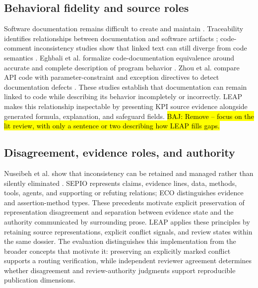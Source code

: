 \documentclass[a4paper,fleqn]{cas-dc}
\newcommand{\baj}[1]{{\sethlcolor{yellow}\hl{BAJ: #1}}}
\begin{document}
\subsection{Behavioral fidelity and source roles}
Software documentation remains difficult to create and maintain \citep{Aghajani2019}. Traceability identifies relationships between documentation and software artifacts \citep{MaderGotel2012}; code-comment inconsistency studies show that linked text can still diverge from code semantics \citep{Wen2019,Xu2024}. Eghbali et al. formalize code-documentation equivalence around accurate and complete description of program behavior \citep{Eghbali2026}. Zhou et al. compare API code with parameter-constraint and exception directives to detect documentation defects \citep{Zhou2017}. These studies establish that documentation can remain linked to code while describing its behavior incompletely or incorrectly. LEAP makes this relationship inspectable by presenting KPI source evidence alongside generated formula, explanation, and safeguard fields.
\baj{Remove -- focus on the lit review, with only a sentence or two describing how LEAP fills gaps.}
%

\subsection{Disagreement, evidence roles, and authority}
Nuseibeh et al. show that inconsistency can be retained and managed rather than silently eliminated \citep{Nuseibeh2001}. SEPIO \citep{Brush2016} represents claims, evidence lines, data, methods, tools, agents, and supporting or refuting relations; ECO \citep{Giglio2019} distinguishes evidence and assertion-method types. These precedents motivate explicit preservation of representation disagreement and separation between evidence state and the authority communicated by surrounding prose. LEAP applies these principles by retaining source representations, explicit conflict signals, and review states within the same dossier. The evaluation distinguishes this implementation from the broader concepts that motivate it: preserving an explicitly marked conflict supports a routing verification, while independent reviewer agreement determines whether disagreement and review-authority judgments support reproducible publication dimensions.
\end{document}
